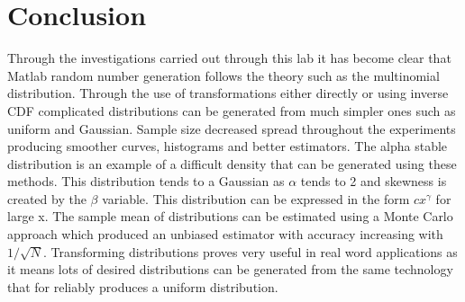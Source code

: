 \documentclass[twoside,twocolumn]{article}
\begin{document}
\section{Conclusion}
Through the investigations carried out through this lab it has become clear that Matlab random number generation follows the theory such as the multinomial distribution. Through the use of transformations either directly or using inverse CDF complicated distributions can be generated from much simpler ones such as uniform and Gaussian. Sample size decreased spread throughout the experiments producing smoother curves, histograms and better estimators. The alpha stable distribution is an example of a difficult density that can be generated using these methods. This distribution tends to a Gaussian as $\alpha$ tends to 2 and skewness is created by the $\beta$ variable. This distribution can be expressed in the form $cx^{\gamma}$ for large x. The sample mean of distributions can be estimated using a Monte Carlo approach which produced an unbiased estimator with accuracy increasing with $1/\sqrt{N}$. Transforming distributions proves very useful in real word applications as it means lots of desired distributions can be generated from the same technology that for reliably produces a uniform distribution.
\end{document}
